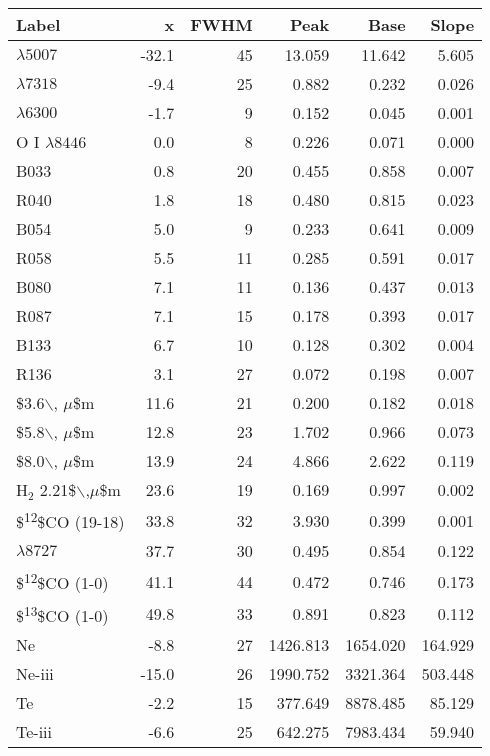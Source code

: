 \begin{tabular}{lrrrrr}
Label & x & FWHM & Peak & Base & Slope\\
\hline
[O III] \(\lambda 5007\) & -32.1 & 45 & 13.059 & 11.642 & 5.605\\
[O II] \(\lambda 7318\) & -9.4 & 25 & 0.882 & 0.232 & 0.026\\
[O I] \(\lambda 6300\) & -1.7 & 9 & 0.152 & 0.045 & 0.001\\
O I \(\lambda 8446\) & 0.0 & 8 & 0.226 & 0.071 & 0.000\\
\hline
B033 & 0.8 & 20 & 0.455 & 0.858 & 0.007\\
R040 & 1.8 & 18 & 0.480 & 0.815 & 0.023\\
B054 & 5.0 & 9 & 0.233 & 0.641 & 0.009\\
R058 & 5.5 & 11 & 0.285 & 0.591 & 0.017\\
B080 & 7.1 & 11 & 0.136 & 0.437 & 0.013\\
R087 & 7.1 & 15 & 0.178 & 0.393 & 0.017\\
B133 & 6.7 & 10 & 0.128 & 0.302 & 0.004\\
R136 & 3.1 & 27 & 0.072 & 0.198 & 0.007\\
\hline
\$3.6$\backslash$, \(\mu\)\$m & 11.6 & 21 & 0.200 & 0.182 & 0.018\\
\$5.8$\backslash$, \(\mu\)\$m & 12.8 & 23 & 1.702 & 0.966 & 0.073\\
\$8.0$\backslash$, \(\mu\)\$m & 13.9 & 24 & 4.866 & 2.622 & 0.119\\
\hline
H\(_{2}\) 2.21\$$\backslash$,\(\mu\)\$m & 23.6 & 19 & 0.169 & 0.997 & 0.002\\
\$\textsuperscript{12}\$CO (19-18) & 33.8 & 32 & 3.930 & 0.399 & 0.001\\
[C I] \(\lambda 8727\) & 37.7 & 30 & 0.495 & 0.854 & 0.122\\
\$\textsuperscript{12}\$CO (1-0) & 41.1 & 44 & 0.472 & 0.746 & 0.173\\
\$\textsuperscript{13}\$CO (1-0) & 49.8 & 33 & 0.891 & 0.823 & 0.112\\
\hline
Ne & -8.8 & 27 & 1426.813 & 1654.020 & 164.929\\
Ne-iii & -15.0 & 26 & 1990.752 & 3321.364 & 503.448\\
Te & -2.2 & 15 & 377.649 & 8878.485 & 85.129\\
Te-iii & -6.6 & 25 & 642.275 & 7983.434 & 59.940\\
\hline
\end{tabular}
